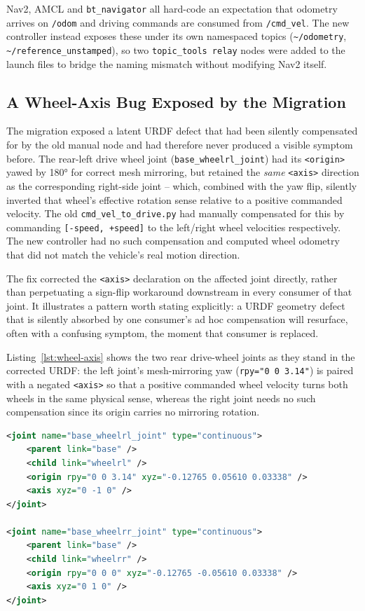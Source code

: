 Nav2, AMCL and \texttt{bt\_navigator} all hard-code an expectation
that odometry arrives on \texttt{/odom} and driving commands are
consumed from \texttt{/cmd\_vel}. The new controller instead exposes
these under its own namespaced topics
(\texttt{\textasciitilde/odometry}, \texttt{\textasciitilde/reference\_unstamped}),
so two \texttt{topic\_tools relay} nodes were added to the launch
files to bridge the naming mismatch without modifying Nav2 itself.

\subsection{A Wheel-Axis Bug Exposed by the Migration}
\label{sec:wheel-axis-bug}

The migration exposed a latent URDF defect that had been silently
compensated for by the old manual node and had therefore never
produced a visible symptom before. The rear-left drive wheel joint
(\texttt{base\_wheelrl\_joint}) had its \texttt{<origin>} yawed by
\ang{180} for correct mesh mirroring, but retained the \emph{same}
\texttt{<axis>} direction as the corresponding right-side joint --
which, combined with the yaw flip, silently inverted that wheel's
effective rotation sense relative to a positive commanded velocity.
The old \texttt{cmd\_vel\_to\_drive.py} had manually compensated for
this by commanding \texttt{[-speed, +speed]} to the left/right wheel
velocities respectively. The new controller had no such
compensation and computed wheel odometry that did not match the
vehicle's real motion direction.

The fix corrected the \texttt{<axis>} declaration on the affected
joint directly, rather than perpetuating a sign-flip workaround
downstream in every consumer of that joint. It illustrates a pattern
worth stating explicitly: a URDF geometry defect that is silently
absorbed by one consumer's ad hoc compensation will resurface, often
with a confusing symptom, the moment that consumer is replaced.

Listing~\ref{lst:wheel-axis} shows the two rear drive-wheel joints as
they stand in the corrected URDF: the left joint's mesh-mirroring yaw
(\texttt{rpy="0 0 3.14"}) is paired with a negated \texttt{<axis>} so
that a positive commanded wheel velocity turns both wheels in the
same physical sense, whereas the right joint needs no such
compensation since its origin carries no mirroring rotation.

\begin{lstlisting}[language=XML,caption={Rear-left and rear-right drive-wheel joints (\texttt{urdf/qcar\_model.xacro}) -- the axis on the mirrored left joint is negated to compensate for its \ang{180} origin yaw.},label={lst:wheel-axis}]
<joint name="base_wheelrl_joint" type="continuous">
    <parent link="base" />
    <child link="wheelrl" />
    <origin rpy="0 0 3.14" xyz="-0.12765 0.05610 0.03338" />
    <axis xyz="0 -1 0" />
</joint>

<joint name="base_wheelrr_joint" type="continuous">
    <parent link="base" />
    <child link="wheelrr" />
    <origin rpy="0 0 0" xyz="-0.12765 -0.05610 0.03338" />
    <axis xyz="0 1 0" />
</joint>
\end{lstlisting}

